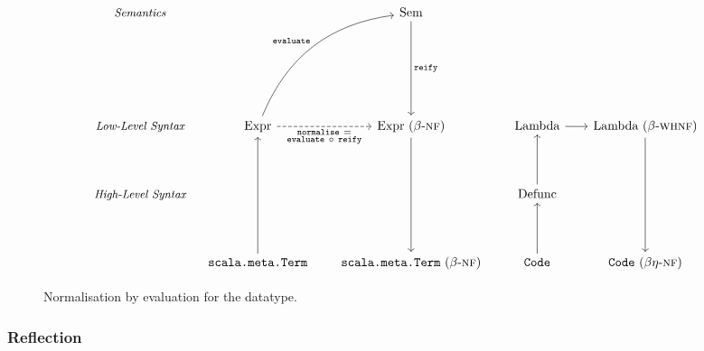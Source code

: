 \documentclass[../../../main.tex]{subfiles}
\begin{document}
\begin{figure}[htbp]
\begin{equation*}
\begin{tikzcd}[row sep=3.75em,column sep=0.9em]
  {\small \textit{Semantics}}         &                                                                                                                                                           &  & \text{Sem} \arrow[dd, "\texttt{reify}"]               &  &                          &  &                                                            \\
                                      &                                                                                                                                                           &  &                                                       &  &                          &  &                                                            \\
  {\small \textit{Low-Level Syntax}}  & \text{Expr} \arrow[rruu, "\texttt{evaluate}", bend left] \arrow[rr, "\substack{\texttt{normalise}\ = \\ \texttt{evaluate}\ \circ\ \texttt{reify}}"', dashed] &  & \text{Expr ($\beta$-\textsc{nf})} \arrow[dd]          &  & \text{Lambda} \arrow[rr] &  & \text{Lambda ($\beta$-\textsc{whnf})} \arrow[dd] \\
  {\small \textit{High-Level Syntax}} &                                                                                                                                                           &  &                                                       &  & \text{Defunc} \arrow[u]  &  &                                                            \\
                                      & \texttt{scala.meta.Term} \arrow[uu]                                                                                                                       &  & \texttt{scala.meta.Term}\text{ ($\beta$-\textsc{nf})} &  & \texttt{Code} \arrow[u]  &  & \texttt{Code}\text{ ($\beta\eta$-\textsc{nf})}            
  \end{tikzcd}
\end{equation*}
\caption{Normalisation by evaluation for the  datatype.}
\end{figure}

\subsubsection{Reflection}
\end{document}
